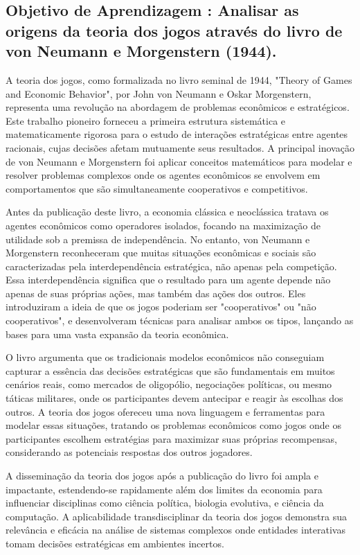 \documentclass[a4paper,12pt]{article}[abntex2]
\begin{document}
\subsection{\textbf{Objetivo de Aprendizagem : Analisar as origens da teoria dos jogos através do livro de von Neumann e Morgenstern (1944).}}
A teoria dos jogos, como formalizada no livro seminal de 1944, "Theory of Games and Economic Behavior", por John von Neumann e Oskar Morgenstern, representa uma revolução na abordagem de problemas econômicos e estratégicos. Este trabalho pioneiro forneceu a primeira estrutura sistemática e matematicamente rigorosa para o estudo de interações estratégicas entre agentes racionais, cujas decisões afetam mutuamente seus resultados. A principal inovação de von Neumann e Morgenstern foi aplicar conceitos matemáticos para modelar e resolver problemas complexos onde os agentes econômicos se envolvem em comportamentos que são simultaneamente cooperativos e competitivos.

Antes da publicação deste livro, a economia clássica e neoclássica tratava os agentes econômicos como operadores isolados, focando na maximização de utilidade sob a premissa de independência. No entanto, von Neumann e Morgenstern reconheceram que muitas situações econômicas e sociais são caracterizadas pela interdependência estratégica, não apenas pela competição. Essa interdependência significa que o resultado para um agente depende não apenas de suas próprias ações, mas também das ações dos outros. Eles introduziram a ideia de que os jogos poderiam ser "cooperativos" ou "não cooperativos", e desenvolveram técnicas para analisar ambos os tipos, lançando as bases para uma vasta expansão da teoria econômica.

O livro argumenta que os tradicionais modelos econômicos não conseguiam capturar a essência das decisões estratégicas que são fundamentais em muitos cenários reais, como mercados de oligopólio, negociações políticas, ou mesmo táticas militares, onde os participantes devem antecipar e reagir às escolhas dos outros. A teoria dos jogos ofereceu uma nova linguagem e ferramentas para modelar essas situações, tratando os problemas econômicos como jogos onde os participantes escolhem estratégias para maximizar suas próprias recompensas, considerando as potenciais respostas dos outros jogadores.

A disseminação da teoria dos jogos após a publicação do livro foi ampla e impactante, estendendo-se rapidamente além dos limites da economia para influenciar disciplinas como ciência política, biologia evolutiva, e ciência da computação. A aplicabilidade transdisciplinar da teoria dos jogos demonstra sua relevância e eficácia na análise de sistemas complexos onde entidades interativas tomam decisões estratégicas em ambientes incertos.
\end{document}

